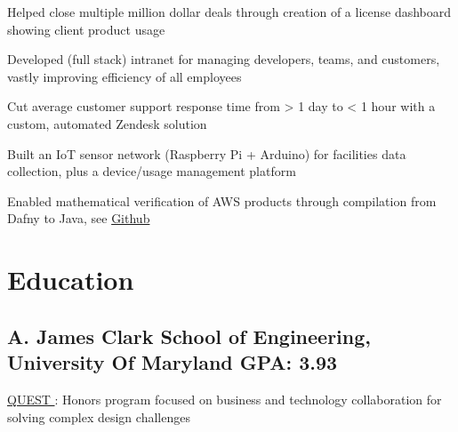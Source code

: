 \documentclass[print]{jack-resume}
\begin{document}
\begin{tightemize}
    \item Helped close multiple million dollar deals through creation of a license dashboard showing client product usage
    \item Developed (full stack) intranet for managing developers, teams, and customers, vastly improving efficiency of all employees
    \item Cut average customer support response time from > 1 day to < 1 hour with a custom, automated Zendesk solution
\end{tightemize}
\sectionsep

\begin{tightemize}
    \item Built an IoT sensor network (Raspberry Pi + Arduino) for facilities data collection, plus a device/usage management platform
\end{tightemize}

\begin{tightemize}
    \item Enabled mathematical verification of AWS products through compilation from Dafny to Java, see \href{https://github.com/dafny-lang/dafny}{Github \ExternalLink}
\end{tightemize}
\sectionsep

\section{Education}
\subsection{A. James Clark School of Engineering, University Of Maryland \hfill GPA: 3.93}
 \hfill
\begin{tightemize}
    \item \color{darkmodePrimary}\href{https://www.rhsmith.umd.edu/programs/undergraduate-programs/academics/fellows-special-programs/quest}{QUEST \ExternalLink}: Honors program focused on business and technology collaboration for solving complex design challenges
\end{tightemize}

\begin{minipage}[t]{0.04\textwidth}
    \hfill
\end{minipage}
\end{document}
